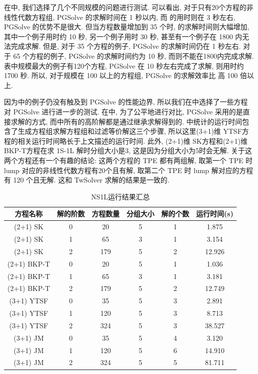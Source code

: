 在中, 我们选择了几个不同规模的问题进行测试. 可以看出, 对于只有20个方程的非线性代数方程组, PGSolve 的求解时间在 1 秒以内, 而  的用时则在 3 秒左右, PGSolve 的优势不是很大. 但当方程数量增加到 35 个时,  的求解时间则大幅增加, 其中一个例子用时约 10 秒, 另一个例子用时 30 秒, 甚至有一个例子在 1800 内无法完成求解. 但是, 对于 35 个方程的例子, PGSolve 的求解时间仍在 1 秒左右. 对于 65 个方程的例子, PGSolve 的求解时间约为 10 秒, 而则不能在1800内完成求解. 表中规模最大的例子有120个方程, PGSolve 在 10 秒左右完成了求解, 则用时约 1700 秒. 所以, 对于规模在 100 以上的方程组, PGSolve 的求解效率比  高 100 倍以上.

因为中的例子仍没有触及到 PGSolve 的性能边界, 所以我们在中选择了一些方程对 PGSolve 进行进一步的测试. 在中, 为了公平地进行对比, PGSolve 采用的是直接求解的方式, 而中所有的高阶解都是通过继承求解得到的. 中统计的运行时间包含了生成方程组\D 求解方程组和过滤等价解这三个步骤, 所以这里(3+1)维 YTSF方程的相关运行时间略长于上文描述的运行时间. 此外, (2+1)维 SK方程和(2+1)维 BKP-T方程在求 1S-1L 解时分组大小是3, 这是因为分组大小为5时会无解. 关于这两个方程还有一个有趣的结论: 这两个方程的 TPE 都有两组解, 取第一个 TPE 时 lump 对应的非线性代数方程有20个且有解, 取第二个 TPE 时 lump 解对应的方程有 120 个且无解. 这和 TwSolver 求解的结果是一致的. 

\begin{table}[htbp]
\centering
\caption{NS1L运行结果汇总} \label{NS1L-tb}
\begin{tabular}{cccccc}
\hline
方程名称    & 解的阶数 & 方程数量 & 分组大小 & 解的个数 & 运行时间(s) \\ 
\hline 
(2+1) SK & 0 & 20 & 5 & 1 & 1.875 \\
(2+1) SK & 1 & 65 & 3 & 1 & 3.154 \\
(2+1) SK & 2 & 179 & 5 & 2 & 12.926 \\
(2+1) BKP-T & 0 & 20 & 5 & 1 & 1.036 \\
(2+1) BKP-T & 1 & 65 & 3 & 1 & 3.181 \\
(2+1) BKP-T & 2 & 179 & 5 & 2 & 12.749 \\
(3+1) YTSF & 0 & 35 & 5 & 3 & 2.891 \\
(3+1) YTSF & 1 & 120 & 5 & 3 & 8.713 \\
(3+1) YTSF & 2 & 324 & 5 & 3 & 38.527 \\
(3+1) JM & 0 & 35 & 5 & 4 & 3.120 \\
(3+1) JM & 1 & 120 & 5 & 6 & 14.910 \\
(3+1) JM & 2 & 324 & 5 & 5 & 81.711 \\
\hline 
\end{tabular}
\end{table}

